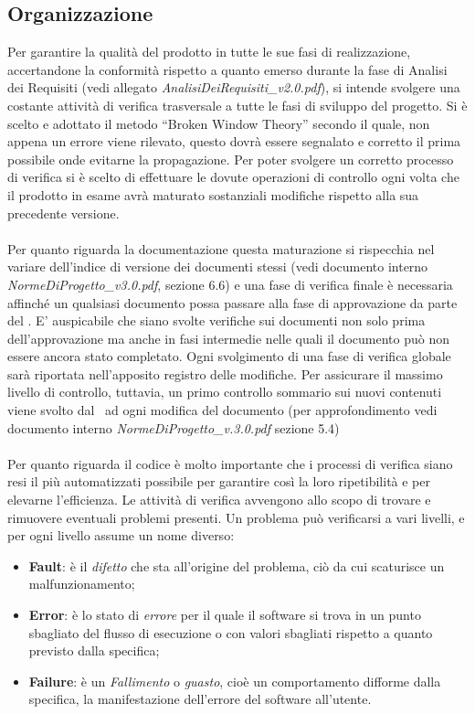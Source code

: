 \subsection{Organizzazione}

Per garantire la qualità del prodotto in tutte le sue fasi di realizzazione, accertandone la conformità rispetto a quanto emerso durante la fase di Analisi dei Requisiti (vedi allegato \textit{AnalisiDeiRequisiti\_v2.0.pdf}), si intende svolgere una costante attività di verifica trasversale a tutte le fasi di sviluppo del progetto. Si è scelto e adottato il metodo ``Broken Window Theory'' secondo il quale, non appena un errore viene rilevato, questo dovrà essere segnalato e corretto il prima possibile onde evitarne la propagazione. Per poter svolgere un corretto processo di verifica si è scelto di effettuare le dovute operazioni di controllo ogni volta che il prodotto in esame avrà maturato sostanziali modifiche rispetto alla sua precedente versione. \\ \\
Per quanto riguarda la documentazione questa maturazione si rispecchia nel variare dell'indice di versione dei documenti stessi (vedi documento interno \textit{NormeDiProgetto\_v3.0.pdf}, sezione 6.6) e una fase di verifica finale è necessaria affinché un qualsiasi documento possa passare alla fase di approvazione da parte del \ruoloResponsabile. E' auspicabile che siano svolte verifiche sui documenti non solo prima dell'approvazione ma anche in fasi intermedie nelle quali il documento può non essere ancora stato completato. Ogni svolgimento di una fase di verifica globale sarà riportata nell'apposito registro delle modifiche. Per assicurare il massimo livello di controllo, tuttavia, un primo controllo sommario sui nuovi contenuti viene svolto dal \ruoloVerificatore\ ad ogni modifica del documento (per approfondimento vedi documento interno \textit{NormeDiProgetto\_v.3.0.pdf} sezione 5.4)
\\ \\
 Per quanto riguarda il codice è molto importante che i processi di verifica siano resi il più automatizzati possibile per garantire così la loro ripetibilità e per elevarne l'efficienza. Le attività di verifica avvengono allo scopo di trovare e rimuovere eventuali problemi presenti. Un problema può verificarsi a vari livelli, e per ogni livello assume un nome diverso:
\begin{itemize}
	\item \textbf{Fault}: è il \textit{difetto} che sta all'origine del problema, ciò da cui scaturisce un malfunzionamento;
	\item \textbf{Error}: è lo stato di \textit{errore} per il quale il software si trova in un punto sbagliato del flusso di esecuzione o con valori sbagliati rispetto a quanto previsto dalla specifica;
	\item \textbf{Failure}: è un \textit{Fallimento} o \textit{guasto}, cioè un comportamento difforme dalla specifica, la manifestazione dell'errore del software all'utente.
\end{itemize}\\
